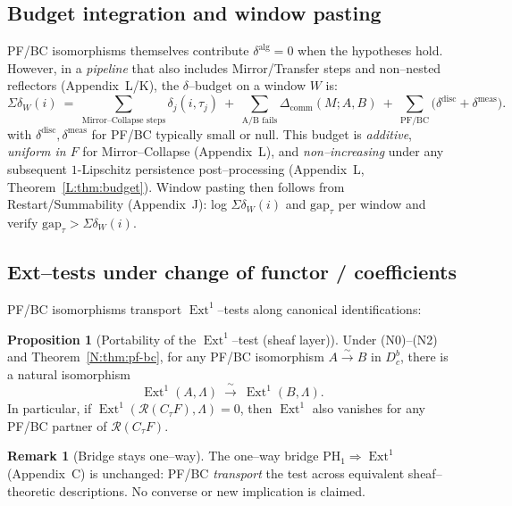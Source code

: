 \documentclass[11pt]{article}
\numberwithin{equation}{section}
\theoremstyle{plain}
\theoremstyle{definition}
\theoremstyle{remark}
\DeclareMathOperator{\Ext}{Ext}
\DeclareRobustCommand{\hyp}{\nobreakdash-}
\theoremstyle{plain}
\theoremstyle{definition}
\numberwithin{equation}{section}
\newtheorem{proposition}[theorem]{Proposition}
\theoremstyle{definition}
\newtheorem{remark}[theorem]{Remark}
\numberwithin{equation}{section}
\theoremstyle{plain}
\theoremstyle{definition}
\theoremstyle{remark}
\begin{document}
\subsection{Budget integration and window pasting}
\label{N:budget}
PF/BC isomorphisms themselves contribute \(\delta^{\mathrm{alg}}=0\) when the hypotheses hold. However, in a \emph{pipeline} that also includes Mirror/Transfer steps and non–nested reflectors (Appendix~L/K), the \(\delta\)–budget on a window \(W\) is:
\[
\Sigma\delta_W(i)\ =\ \sum_{\text{Mirror--Collapse steps}} \delta_j(i,\tau_j)\ +\ \sum_{\text{A/B fails}} \Delta_{\mathrm{comm}}(M;A,B)\ +\ \sum_{\text{PF/BC}} \bigl(\delta^{\mathrm{disc}}+\delta^{\mathrm{meas}}\bigr).
\]
with \(\delta^{\mathrm{disc}},\delta^{\mathrm{meas}}\) for PF/BC typically small or null. This budget is \emph{additive}, \emph{uniform in \(F\)} for Mirror–Collapse (Appendix~L), and \emph{non–increasing} under any subsequent \(1\)\hyp Lipschitz persistence post–processing (Appendix~L, Theorem~\ref{L:thm:budget}). Window pasting then follows from Restart/Summability (Appendix~J): log \(\Sigma\delta_W(i)\) and \(\mathrm{gap}_\tau\) per window and verify \(\mathrm{gap}_\tau>\Sigma\delta_W(i)\).

\subsection{Ext–tests under change of functor / coefficients}
\label{N:ext-tests}
PF/BC isomorphisms transport \(\Ext^1\)–tests along canonical identifications:

\begin{proposition}[Portability of the \(\Ext^1\)–test \textup{(sheaf layer)}]
Under \textup{(N0)–(N2)} and Theorem~\ref{N:thm:pf-bc}, for any PF/BC isomorphism \(A \xrightarrow{\sim} B\) in \(D^{b}_{c}\), there is a natural isomorphism
\[
\Ext^1(A,\Lambda)\ \xrightarrow{\ \sim\ }\ \Ext^1(B,\Lambda).
\]
In particular, if \(\Ext^1(\mathcal{R}(C_\tau F),\Lambda)=0\), then \(\Ext^1\) also vanishes for any PF/BC partner of \(\mathcal{R}(C_\tau F)\).
\end{proposition}

\begin{remark}[Bridge stays one–way]
The one–way bridge \(\mathrm{PH}_1\Rightarrow \Ext^1\) (Appendix~C) is unchanged: PF/BC \emph{transport} the test across equivalent sheaf–theoretic descriptions. No converse or new implication is claimed.
\end{remark}
\end{document}
